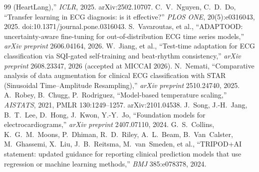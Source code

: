 \documentclass[review,12pt,nonatbib]{elsarticle}
\begin{document}
\begin{thebibliography}{99}
(HeartLang),'' \emph{ICLR}, 2025. arXiv:2502.10707.
 C.~V.~Nguyen, C.~D.~Do, ``Transfer learning in ECG
diagnosis: is it effective?'' \emph{PLOS ONE}, 20(5):e0316043, 2025.
doi:10.1371/journal.pone.0316043.
 S.~Vavaroutas, et al., ``ADAPTOOD:
uncertainty-aware fine-tuning for out-of-distribution ECG time series
models,'' \emph{arXiv preprint} 2606.04164, 2026.
 W.~Jiang, et al., ``Test-time adaptation for ECG
classification via SQI-gated self-training and beat-rhythm
consistency,'' \emph{arXiv preprint} 2608.23347, 2026 (accepted at
MICCAI 2026).
 N.~Nemati, ``Comparative analysis of data
augmentation for clinical ECG classification with STAR (Sinusoidal
Time--Amplitude Resampling),'' \emph{arXiv preprint} 2510.24740, 2025.
 A.~Robey, B.~Chugg, P.~Rodriguez,
``Model-based temperature scaling,'' \emph{AISTATS}, 2021,
PMLR 130:1249--1257. arXiv:2101.04538.
 J.~Song, J.-H.~Jang, B.~T.~Lee, D.~Hong,
J.~Kwon, Y.-Y.~Jo, ``Foundation models for electrocardiograms,''
\emph{arXiv preprint} 2407.07110, 2024.
 G.~S.~Collins, K.~G.~M.~Moons, P.~Dhiman,
R.~D.~Riley, A.~L.~Beam, B.~Van~Calster, M.~Ghassemi, X.~Liu,
J.~B.~Reitsma, M.~van~Smeden, et al., ``TRIPOD+AI statement: updated
guidance for reporting clinical prediction models that use regression
or machine learning methods,'' \emph{BMJ} 385:e078378, 2024.
\end{thebibliography}
\end{document}
